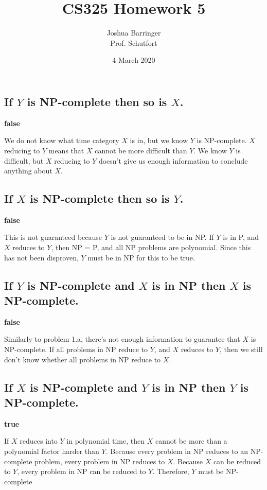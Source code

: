 \documentclass{article}
\title{CS325 Homework 5}
\author{Joshua Barringer \\
        Prof. Schutfort}
\date{4 March 2020}
\begin{document}
\maketitle

\section{}

\subsection{If $Y$ is NP-complete then so is $X$.}

\textbf{false}

We do not know what time category $X$ is in, but we know $Y$ is NP-complete.  $X$ reducing to $Y$ means that $X$ cannot be more difficult than $Y$.  We know $Y$ is difficult, but $X$ reducing to $Y$ doesn't give us enough information to conclude anything about $X$.

\subsection{If $X$ is NP-complete then so is $Y$.}

\textbf{false}

This is not guaranteed because $Y$ is not guaranteed to be in NP.  If $Y$ is in P, and $X$ reduces to $Y$, then NP = P, and all NP problems are polynomial.  Since this has not been disproven, $Y$ must be in NP for this to be true.

\subsection{If $Y$ is NP-complete and $X$ is in NP then $X$ is NP-complete.}

\textbf{false}

Similarly to problem 1.a, there's not enough information to guarantee that $X$ is NP-complete.  If all problems in NP reduce to $Y$, and $X$ reduces to $Y$, then we still don't know whether all problems in NP reduce to $X$.

\subsection{If $X$ is NP-complete and $Y$ is in NP then $Y$ is NP-complete.}

\textbf{true}

If $X$ reduces into $Y$ in polynomial time, then $X$ cannot be more than a polynomial factor harder than $Y$.  Because every problem in NP reduces to an NP-complete problem, every problem in NP reduces to $X$.  Because $X$ can be reduced to $Y$, every problem in NP can be reduced to $Y$.  Therefore, $Y$ must be NP-complete
\end{document}
